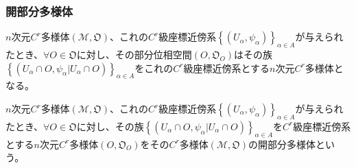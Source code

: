 \documentclass[dvipdfmx]{jsarticle}
\begin{document}
\subsubsection{開部分多様体}%
\begin{thm}\label{8.3.1.8}
$n$次元$C^{r}$多様体$\left( \mathcal{M},\mathfrak{O} \right)$、これの$C^{r}$級座標近傍系$\left\{ \left( U_{\alpha},\psi_{\alpha} \right) \right\}_{\alpha \in A}$が与えられたとき、$\forall O \in \mathfrak{O}$に対し、その部分位相空間$\left( O,\mathfrak{O}_{O} \right)$はその族$\left\{ \left( U_{\alpha} \cap O, \psi_{\alpha}|U_{\alpha} \cap O \right) \right\}_{\alpha \in A}$をこれの$C^{r}$級座標近傍系とする$n$次元$C^{r}$多様体となる。
\end{thm}
\begin{dfn}
$n$次元$C^{r}$多様体$\left( \mathcal{M},\mathfrak{O} \right)$、これの$C^{r}$級座標近傍系$\left\{ \left( U_{\alpha},\psi_{\alpha} \right) \right\}_{\alpha \in A}$が与えられたとき、$\forall O \in \mathfrak{O}$に対し、その族$\left\{ \left( U_{\alpha} \cap O,\psi_{\alpha}|U_{\alpha} \cap O \right) \right\}_{\alpha \in A}$を$C^{r}$級座標近傍系とする$n$次元$C^{r}$多様体$\left( O,\mathfrak{O}_{O} \right)$をその$C^{r}$多様体$\left( \mathcal{M},\mathfrak{O} \right)$の開部分多様体という。
\end{dfn}
\end{document}
